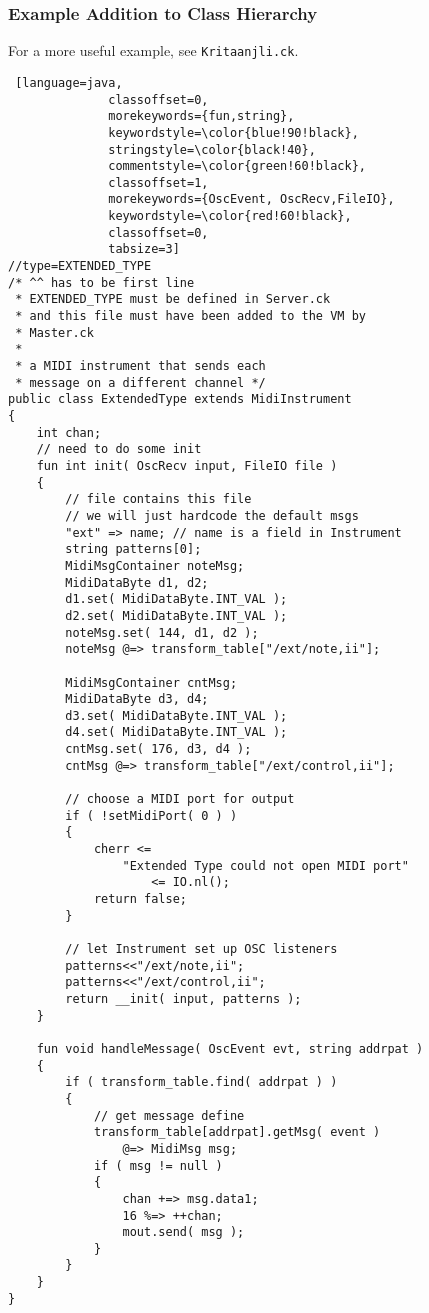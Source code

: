 \documentclass[../main.tex]{subfiles}
\begin{document}
\subsubsection{Example Addition to Class Hierarchy}
For a more useful example, see \texttt{Kritaanjli.ck}.
\begin{lstlisting} [language=java,
			  classoffset=0,
			  morekeywords={fun,string},
			  keywordstyle=\color{blue!90!black},
			  stringstyle=\color{black!40},
			  commentstyle=\color{green!60!black},
			  classoffset=1,
			  morekeywords={OscEvent, OscRecv,FileIO},
			  keywordstyle=\color{red!60!black},
			  classoffset=0,
			  tabsize=3]
//type=EXTENDED_TYPE
/* ^^ has to be first line
 * EXTENDED_TYPE must be defined in Server.ck
 * and this file must have been added to the VM by
 * Master.ck 
 *
 * a MIDI instrument that sends each 
 * message on a different channel */
public class ExtendedType extends MidiInstrument
{
	int chan;
	// need to do some init
	fun int init( OscRecv input, FileIO file )
	{
		// file contains this file
		// we will just hardcode the default msgs
		"ext" => name; // name is a field in Instrument
		string patterns[0];
		MidiMsgContainer noteMsg;
		MidiDataByte d1, d2;
		d1.set( MidiDataByte.INT_VAL );
		d2.set( MidiDataByte.INT_VAL );
		noteMsg.set( 144, d1, d2 );
		noteMsg @=> transform_table["/ext/note,ii"];
		
		MidiMsgContainer cntMsg;
		MidiDataByte d3, d4;
		d3.set( MidiDataByte.INT_VAL );
		d4.set( MidiDataByte.INT_VAL );
		cntMsg.set( 176, d3, d4 );
		cntMsg @=> transform_table["/ext/control,ii"];
		
		// choose a MIDI port for output
		if ( !setMidiPort( 0 ) )
		{
			cherr <= 
				"Extended Type could not open MIDI port" 
					<= IO.nl();
			return false;
		}
		
		// let Instrument set up OSC listeners
		patterns<<"/ext/note,ii";
		patterns<<"/ext/control,ii";
		return __init( input, patterns );
	}
	
	fun void handleMessage( OscEvent evt, string addrpat )
	{
		if ( transform_table.find( addrpat ) )
		{
			// get message define
			transform_table[addrpat].getMsg( event ) 
				@=> MidiMsg msg;
			if ( msg != null )
			{
				chan +=> msg.data1;
				16 %=> ++chan;
				mout.send( msg );
			}
		}
	}
}

  
\end{lstlisting}
\end{document}

